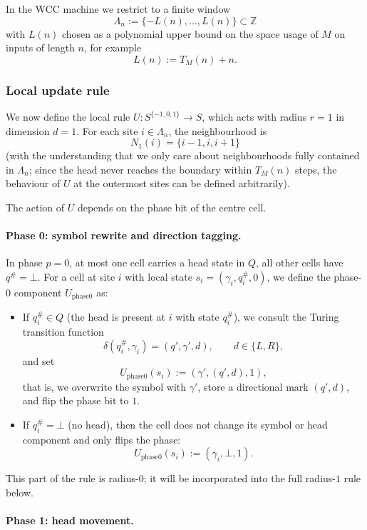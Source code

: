 \documentclass[12pt]{article}
\begin{document}
In the WCC machine we restrict to a finite window
\[
\Lambda_n := \{-L(n), \dots, L(n)\} \subset \mathbb{Z}
\]
with $L(n)$ chosen as a polynomial upper bound on the space usage of $M$ on
inputs of length $n$, for example
\[
L(n) := T_M(n) + n.
\]

\subsubsection{Local update rule}

We now define the local rule $U : S^{\{-1,0,1\}} \to S$, which acts with
radius $r = 1$ in dimension $d=1$. For each site $i \in \Lambda_n$, the
neighbourhood is
\[
N_1(i) = \{i-1,i,i+1\}
\]
(with the understanding that we only care about neighbourhoods fully contained
in $\Lambda_n$; since the head never reaches the boundary within $T_M(n)$
steps, the behaviour of $U$ at the outermost sites can be defined arbitrarily).

The action of $U$ depends on the phase bit of the centre cell.

\paragraph{Phase 0: symbol rewrite and direction tagging.}

In phase $p=0$, at most one cell carries a head state in $Q$, all other cells
have $q^\# = \bot$. For a cell at site $i$ with local state
$s_i = (\gamma_i, q_i^\#, 0)$, we define the phase-$0$ component
$U_{\mathrm{phase0}}$ as:
\begin{itemize}
  \item If $q_i^\# \in Q$ (the head is present at $i$ with state $q_i^\#$), we
    consult the Turing transition function
    \[
    \delta(q_i^\#, \gamma_i) = (q', \gamma', d), \qquad d \in \{L,R\},
    \]
    and set
    \[
    U_{\mathrm{phase0}}(s_i) := (\gamma', (q',d), 1),
    \]
    that is, we overwrite the symbol with $\gamma'$, store a directional mark
    $(q',d)$, and flip the phase bit to $1$.
  \item If $q_i^\# = \bot$ (no head), then the cell does not change its symbol
    or head component and only flips the phase:
    \[
    U_{\mathrm{phase0}}(s_i) := (\gamma_i, \bot, 1).
    \]
\end{itemize}
This part of the rule is radius-$0$; it will be incorporated into the full
radius-$1$ rule below.

\paragraph{Phase 1: head movement.}
\end{document}
